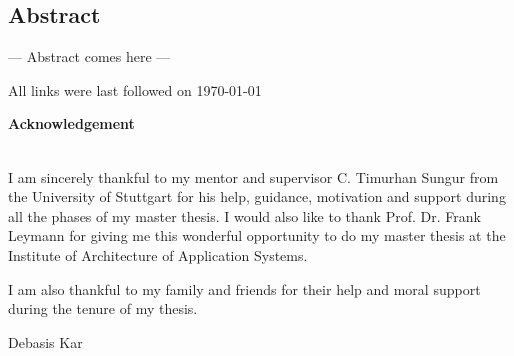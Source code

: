 \documentclass[paper=a4,       %
					 11pt,
					 BCOR0mm,  %
					 DIV10,    %
					 automark, %
					 twoside,
					 halfparskip,
					 bibtotoc,
					 headsepline,
					 normalheadings,
					 appendixprefix,
					 pagesize  %
 ]{scrbook}
\begin{document}
\restoregeometry
\cleardoubleemptypage

\setlength{\parindent}{0.0em}


\begin{center}
\section*{Abstract}
\end{center}
\pagestyle{empty}
--- Abstract comes here ---

\cleardoubleemptypage
\pagestyle{scrheadings}
\tableofcontents
\newpage
\let\cleardoublepage\clearpage

\listoffigures
\let\cleardoublepage\clearpage
\let\cleardoublepage\relax
\listoftables
\let\cleardoublepage\clearpage
\renewcommand{\lstlistlistingname}{List of Listings}
\lstlistoflistings
\let\cleardoublepage\clearpage
\cleardoubleemptypage


\newpage












All links were last followed on \today

\clearpage
\pagestyle{empty}

\pagestyle{empty}
\vspace{9cm}
\begin{center}
	\begin{minipage}{11cm}
		\vspace{6cm}
		\textbf{\Large Acknowledgement}\\\\
		\vspace{0.4cm}

		I am sincerely thankful to my mentor and supervisor C. Timurhan Sungur from the University of Stuttgart for his help, guidance, motivation and support during all the phases of my master thesis. I would also like to thank Prof. Dr. Frank Leymann for giving me this wonderful opportunity to do my master thesis at the Institute of Architecture of Application Systems.
		\vspace{0.4cm}
		 
		I am also thankful to my family and friends for their help and moral support during the tenure of my thesis.
		\vspace{1cm}
		
		Debasis Kar
	\end{minipage}
\end{center}
\end{document}
